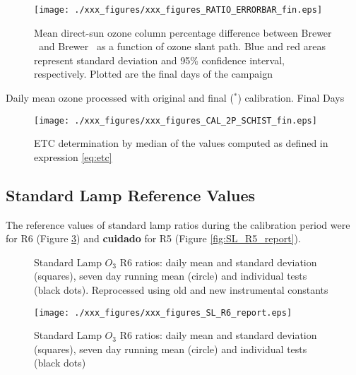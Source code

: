 \begin{figure}[htp!]
\begin{center}   
		\texttt{[image: ./xxx\_figures/xxx\_figures\_RATIO\_ERRORBAR\_fin.eps]}
		\caption{Mean direct-sun ozone column percentage difference between Brewer \brwname\ and Brewer \brwref\ as a function of ozone slant path. Blue and red areas represent standard deviation and 95\% confidence interval, respectively. Plotted are the final days of the campaign}
		\label{fig:RATIO_ERRORBAR_fin}
\end{center}
\end{figure}

\begin{table}[hbp!] \centering
		\caption{Daily mean ozone processed with original and final ($^*$) calibration. Final Days}
		\label{tab:table_ETCdatafin}
		
\end{table}

\begin{figure}[hbtp!]
\begin{center}
		\texttt{[image: ./xxx\_figures/xxx\_figures\_CAL\_2P\_SCHIST\_fin.eps]}
		\caption{ETC determination by median of the values computed as defined in expression \ref{eq:etc}}
		\label{fig:CAL_2P_SCHIST_fin}
\end{center}
\end{figure}

\clearpage
\subsection{Standard Lamp Reference Values}
The reference values of standard lamp ratios during the calibration period were \textbf{\slrefNEW} for R6  (Figure \ref{fig:SL_R6_report}) and \textbf{cuidado} for R5 (Figure \ref{fig:SL_R5_report}).

\begin{figure}[hbtp!]
\begin{center}

{%
  \caption{Standard Lamp $O_3$ R6 ratios: daily mean and standard deviation (squares), seven day running mean (circle) and individual tests (black dots). Reprocessed using old and new instrumental constants}
\label{fig:SL_R6_report}
}
{%
\texttt{[image: ./xxx\_figures/xxx\_figures\_SL\_R6\_report.eps]}
\caption{Standard Lamp $O_3$ R6 ratios: daily mean and standard deviation (squares), seven day running mean (circle) and individual tests (black dots)}
		\label{fig:SL_R6_report}
}

\end{center}
\end{figure}


